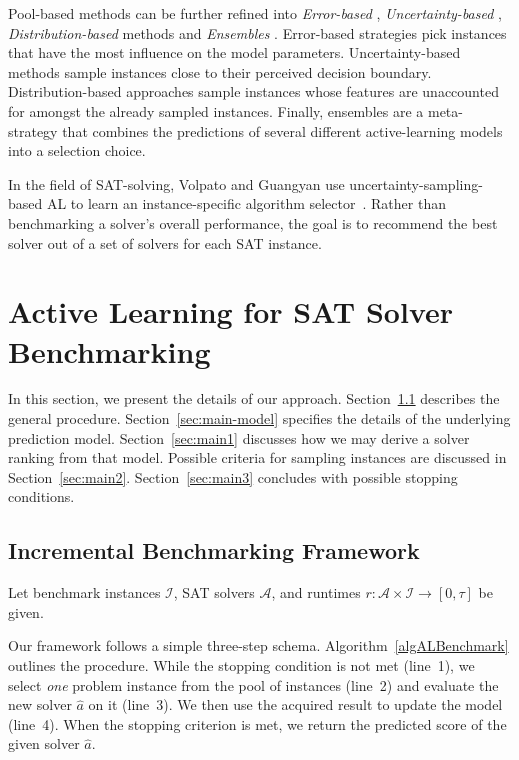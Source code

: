 \documentclass[runningheads]{llncs}
\begin{document}
Pool-based methods can be further refined into \emph{Error-based} \cite{GolbandiKL11,KorenBV09}, \emph{Un\-cer\-tain\-ty-based} \cite{HarpaleY08,KapoorGUD07,TongK01}, \emph{Distribution-based} methods \cite{distribAL,SinhaED19} and \emph{Ensembles} \cite{KornerW06,MelvilleM04}.
Error-based strategies pick instances that have the most influence on the model parameters.
Uncertainty-based methods sample instances close to their perceived decision boundary.
Distribution-based approaches sample instances whose features are unaccounted for amongst the already sampled instances.
Finally, ensembles are a meta-strategy that combines the predictions of several different active-learning models into a selection choice.

In the field of SAT-solving, Volpato and Guangyan use uncertainty-sampling-based AL to learn an instance-specific algorithm selector~\cite{volpato2019active}.
Rather than benchmarking a solver's overall performance, the goal is to recommend the best solver out of a set of solvers for each SAT instance.


\section{Active Learning for SAT Solver Benchmarking}
\label{sec:main}

In this section, we present the details of our approach.
Section~\ref{sec:main-framework} describes the general procedure.
Section~\ref{sec:main-model} specifies the details of the underlying prediction model.
Section~\ref{sec:main1} discusses how we may derive a solver ranking from that model.
Possible criteria for sampling instances are discussed in Section~\ref{sec:main2}.
Section~\ref{sec:main3} concludes with possible stopping conditions.


\subsection{Incremental Benchmarking Framework}
\label{sec:main-framework}

Let benchmark instances $\mathcal{I}$, SAT solvers $\mathcal{A}$, and runtimes $r\!: \mathcal{A} \times \mathcal{I} \rightarrow \left[0, \tau\right]$ be given. 

Our framework follows a simple three-step schema.
Algorithm~\ref{algALBenchmark} outlines the procedure. 
While the stopping condition is not met (line~1), we select \emph{one} problem instance from the pool of instances (line~2) and evaluate the new solver $\hat{a}$ on it (line~3).
We then use the acquired result to update the model (line~4).
When the stopping criterion is met, we return the predicted score of the given solver $\hat{a}$.
\end{document}
